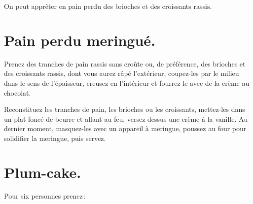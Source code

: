 \sk

On peut apprêter en pain perdu des brioches et des croissants rassis.

\section*{\centering Pain perdu meringué.}
{}

Prenez des tranches de pain rassis sans croûte ou, de préférence, des brioches
et des croissants rassis, dont vous aurez râpé l'extérieur, coupez-les par le milieu
dans le sens de l'épaisseur, creusez-en l'intérieur et fourrez-le avec de la crème
au chocolat.

Reconstituez les tranches de pain, les brioches ou les croissants, mettez-les
dans un plat foncé de beurre et allant au feu, versez dessus une crème à la
vanille. Au dernier moment, masquez-les avec un appareil à meringue, poussez
au four pour solidifier la meringue, puis servez.

\section*{\centering Plum-cake.}
{}

Pour six personnes prenez :

